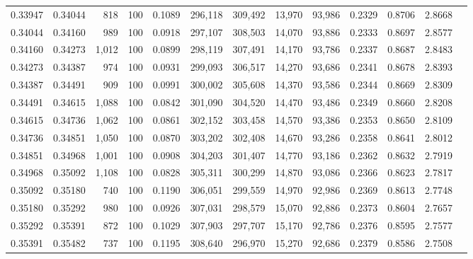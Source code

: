 \begin{tabular}{rrrrrrrrrrrrr}
0.33947 & 0.34044 &   818 & 100 &                                     0.1089 & 296,118 & 309,492 &  13,970 &  93,986 & 0.2329 & 0.8706 & 2.8668 \\
0.34044 & 0.34160 &   989 & 100 &                                     0.0918 & 297,107 & 308,503 &  14,070 &  93,886 & 0.2333 & 0.8697 & 2.8577 \\
0.34160 & 0.34273 & 1,012 & 100 &                                     0.0899 & 298,119 & 307,491 &  14,170 &  93,786 & 0.2337 & 0.8687 & 2.8483 \\
0.34273 & 0.34387 &   974 & 100 &                                     0.0931 & 299,093 & 306,517 &  14,270 &  93,686 & 0.2341 & 0.8678 & 2.8393 \\
0.34387 & 0.34491 &   909 & 100 &                                     0.0991 & 300,002 & 305,608 &  14,370 &  93,586 & 0.2344 & 0.8669 & 2.8309 \\
0.34491 & 0.34615 & 1,088 & 100 &                                     0.0842 & 301,090 & 304,520 &  14,470 &  93,486 & 0.2349 & 0.8660 & 2.8208 \\
0.34615 & 0.34736 & 1,062 & 100 &                                     0.0861 & 302,152 & 303,458 &  14,570 &  93,386 & 0.2353 & 0.8650 & 2.8109 \\
0.34736 & 0.34851 & 1,050 & 100 &                                     0.0870 & 303,202 & 302,408 &  14,670 &  93,286 & 0.2358 & 0.8641 & 2.8012 \\
0.34851 & 0.34968 & 1,001 & 100 &                                     0.0908 & 304,203 & 301,407 &  14,770 &  93,186 & 0.2362 & 0.8632 & 2.7919 \\
0.34968 & 0.35092 & 1,108 & 100 &                                     0.0828 & 305,311 & 300,299 &  14,870 &  93,086 & 0.2366 & 0.8623 & 2.7817 \\
0.35092 & 0.35180 &   740 & 100 &                                     0.1190 & 306,051 & 299,559 &  14,970 &  92,986 & 0.2369 & 0.8613 & 2.7748 \\
0.35180 & 0.35292 &   980 & 100 &                                     0.0926 & 307,031 & 298,579 &  15,070 &  92,886 & 0.2373 & 0.8604 & 2.7657 \\
0.35292 & 0.35391 &   872 & 100 &                                     0.1029 & 307,903 & 297,707 &  15,170 &  92,786 & 0.2376 & 0.8595 & 2.7577 \\
0.35391 & 0.35482 &   737 & 100 &                                     0.1195 & 308,640 & 296,970 &  15,270 &  92,686 & 0.2379 & 0.8586 & 2.7508 \\

\end{tabular}
